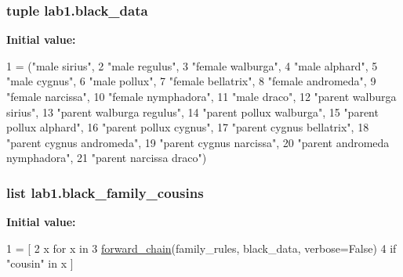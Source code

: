 \subsubsection[{black\+\_\+data}]{\setlength{\rightskip}{0pt plus 5cm}tuple lab1.\+black\+\_\+data}\label{namespacelab1_a8717d4ee063423939345a9b9089bbbee}
{\bfseries Initial value\+:}
\begin{DoxyCode}
1 = (\textcolor{stringliteral}{"male sirius"},
2               \textcolor{stringliteral}{"male regulus"},
3               \textcolor{stringliteral}{"female walburga"},
4               \textcolor{stringliteral}{"male alphard"},
5               \textcolor{stringliteral}{"male cygnus"},
6               \textcolor{stringliteral}{"male pollux"},
7               \textcolor{stringliteral}{"female bellatrix"},
8               \textcolor{stringliteral}{"female andromeda"},
9               \textcolor{stringliteral}{"female narcissa"},
10               \textcolor{stringliteral}{"female nymphadora"},
11               \textcolor{stringliteral}{"male draco"},
12               \textcolor{stringliteral}{"parent walburga sirius"},
13               \textcolor{stringliteral}{"parent walburga regulus"},
14               \textcolor{stringliteral}{"parent pollux walburga"},
15               \textcolor{stringliteral}{"parent pollux alphard"},
16               \textcolor{stringliteral}{"parent pollux cygnus"},
17               \textcolor{stringliteral}{"parent cygnus bellatrix"},
18               \textcolor{stringliteral}{"parent cygnus andromeda"},
19               \textcolor{stringliteral}{"parent cygnus narcissa"},
20               \textcolor{stringliteral}{"parent andromeda nymphadora"},
21               \textcolor{stringliteral}{"parent narcissa draco"})
\end{DoxyCode}
\hypertarget{namespacelab1_a57fa573631e1075c1d6127a56aee196b}{}
\subsubsection[{black\+\_\+family\+\_\+cousins}]{\setlength{\rightskip}{0pt plus 5cm}list lab1.\+black\+\_\+family\+\_\+cousins}\label{namespacelab1_a57fa573631e1075c1d6127a56aee196b}
{\bfseries Initial value\+:}
\begin{DoxyCode}
1 = [ 
2     x \textcolor{keywordflow}{for} x \textcolor{keywordflow}{in} 
3     \hyperlink{namespaceproduction_af279b12f495c76be9424cb6cf0fa014f}{forward\_chain}(family\_rules, black\_data, verbose=\textcolor{keyword}{False}) 
4     \textcolor{keywordflow}{if} \textcolor{stringliteral}{"cousin"} \textcolor{keywordflow}{in} x ]
\end{DoxyCode}
\hypertarget{namespacelab1_a2a12c1747bc9ea2b9438e91ff8de062f}{}
